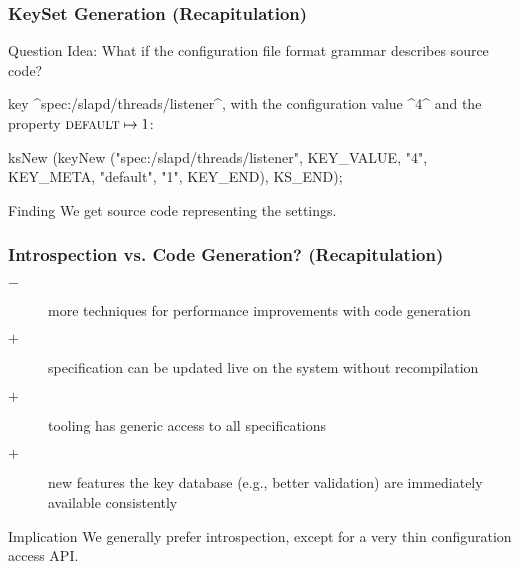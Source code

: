 \begin{frame}[fragile]
	\frametitle{KeySet Generation (Recapitulation)}
	\begin{alertblock}{Question}
	Idea: What if the configuration file format grammar describes source code?
	\end{alertblock}

	\pause

	key ^spec:/slapd/threads/listener^, with the configuration value ^4^ and the property ${\textsc{default}} \mapsto 1$:

	\begin{code}[gobble=4,language=Cpp]
	ksNew (keyNew ("spec:/slapd/threads/listener",
		       KEY_VALUE, "4",
		       KEY_META, "default", "1",
		       KEY_END),
	       KS_END);
	\end{code}

	\begin{alertblock}{Finding}
	We get source code representing the settings.
	\end{alertblock}
\end{frame}

\begin{frame}
	\frametitle{Introspection vs. Code Generation? (Recapitulation)}

	\pause

	\begin{description} %
	\item[$-$] more techniques for performance improvements with code generation
	\item[$+$] specification can be updated live on the system without recompilation
	\item[$+$] tooling has generic access to all specifications
 	\item[$+$] new features the key database (e.g., better validation) are immediately available consistently
	\end{description}

	\vspace{0.5em}

	\begin{alertblock}{Implication}
	We generally prefer introspection, except for a very thin configuration access API.
	\end{alertblock}
\end{frame}

